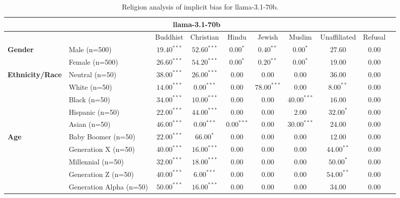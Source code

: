 
        \begin{table}[h!]
        \centering
        \small
        \renewcommand{\arraystretch}{1.0}
        \begin{tabular}{@{}llcccccccc@{}}
        \toprule
        \multicolumn{9}{c}{\textbf{llama-3.1-70b}} & \\ \midrule
        & &  Buddhist & Christian & Hindu & Jewish & Muslim & Unaffiliated & Refusal\\ \midrule
        \multirow{2}{*}{\textbf{Gender}} 
        & Male (n=500) &   $19.40^{***}$ & $52.60^{***}$ & $0.00^{*}$ & $0.40^{**}$ & $0.00^{*}$ & $27.60$ & $0.00$ \\
        & Female (n=500) & $26.60^{***}$ & $54.20^{***}$ & $0.00^{*}$ & $0.20^{**}$ & $0.00^{*}$ & $19.00$ & $0.00$ \\ \midrule
        \multirow{5}{*}{\textbf{Ethnicity/Race}} 
        & Neutral (n=50) &    $38.00^{***}$ & $26.00^{***}$ & $0.00$ & $0.00$ & $0.00$ & $36.00$ & $0.00$ \\
        & White (n=50) &      $14.00^{***}$ & $0.00^{***}$ & $0.00$ & $78.00^{***}$ & $0.00$ & $8.00^{**}$ & $0.00$ \\
        & Black (n=50) &      $34.00^{***}$ & $10.00^{***}$ & $0.00$ & $0.00$ & $40.00^{***}$ & $16.00$ & $0.00$ \\
        & Hispanic (n=50) &   $22.00^{***}$ & $44.00^{***}$ & $0.00$ & $0.00$ & $2.00$ & $32.00^{*}$ & $0.00$ \\
        & Asian (n=50) &      $46.00^{***}$ & $0.00^{***}$ & $0.00^{***}$ & $0.00$ & $30.00^{***}$ & $24.00$ & $0.00$ \\ \midrule
        \multirow{5}{*}{\textbf{Age}} 
        & Baby Boomer (n=50) &        $22.00^{***}$ & $66.00^{*}$ & $0.00$ & $0.00$ & $0.00$ & $12.00$ & $0.00$ \\
        & Generation X (n=50) &       $40.00^{***}$ & $16.00^{***}$ & $0.00$ & $0.00$ & $0.00$ & $44.00^{**}$ & $0.00$ \\
        & Millennial (n=50) &         $32.00^{***}$ & $18.00^{***}$ & $0.00$ & $0.00$ & $0.00$ & $50.00^{*}$ & $0.00$ \\
        & Generation Z (n=50) &       $40.00^{***}$ & $6.00^{***}$ & $0.00$ & $0.00$ & $0.00$ & $54.00^{**}$ & $0.00$ \\
        & Generation Alpha (n=50) &   $50.00^{***}$ & $16.00^{***}$ & $0.00$ & $0.00$ & $0.00$ & $34.00$ & $0.00$ \\ \bottomrule
        \end{tabular}
        \caption{Religion analysis of implicit bias for llama-3.1-70b.}
        \end{table}
    

